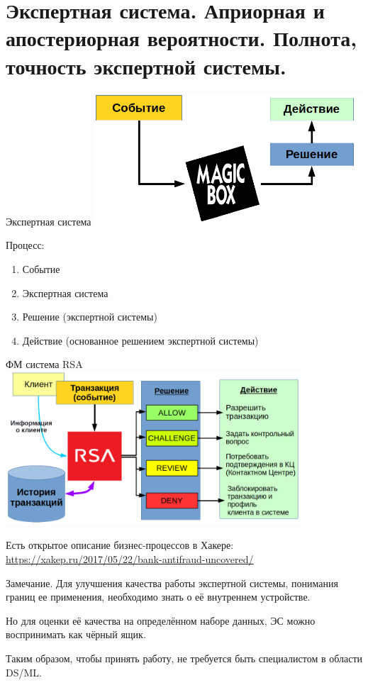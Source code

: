   \section{Экспертная система. Априорная и апостериорная вероятности. Полнота, точность экспертной системы.}\label{section:expert_systems_recall_presision}
  
  \begin{frame}{Экспертная система}
   \includegraphics[width=10cm]{../pic/expert_system_1.png}
  
  Процесс:
  \begin{enumerate}
  	\item Событие
  	\item Экспертная система
  	\item Решение (экспертной системы)
  	\item Действие (основанное решением экспертной системы)
  \end{enumerate}
  \end{frame}

  \begin{frame}{ФМ система RSA}
   \includegraphics[width=11cm]{../pic/expert_system_rsa.png}
  
  Есть открытое описание бизнес-процессов в Хакере:
  \url{https://xakep.ru/2017/05/22/bank-antifraud-uncovered/}
  \end{frame}
  
  \begin{frame}
  	\begin{block}{Замечание.}
  		Для улучшения качества работы экспертной системы, понимания границ ее применения,
  		необходимо знать о её внутреннем устройстве.
  		
  		Но для оценки её качества на определённом наборе данных, ЭС можно воспринимать как чёрный ящик.
  		
  		Таким образом, чтобы принять работу, не требуется быть специалистом в области DS/ML.
  	\end{block}
  \end{frame}




